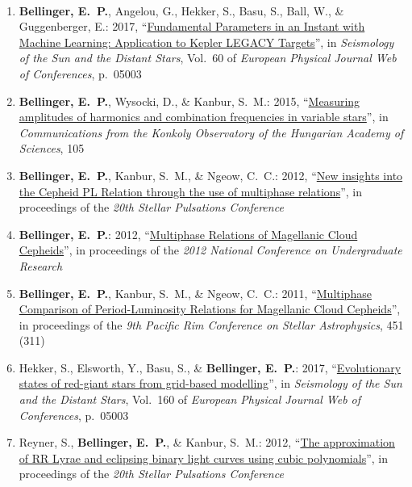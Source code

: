 \newpage
{}\\
\begin{enumerate}
    \item \textbf{Bellinger, E.~P.}, Angelou, G., Hekker, S., Basu, S., Ball, W., \& Guggenberger, E.: 2017,
    ``\href{http://adsabs.harvard.edu/abs/2017EPJWC.16005003B}{Fundamental Parameters in an Instant with Machine Learning: Application to Kepler LEGACY Targets}'', 
    in \emph{Seismology of the Sun and the Distant Stars}, 
    Vol.~60 of \emph{European Physical Journal Web of Conferences}, p.~05003 
    
    \item \textbf{Bellinger, E.~P.}, Wysocki, D., \& Kanbur, S.~M.: 2015,
    ``\href{http://adsabs.harvard.edu/abs/2016CoKon.105..101B}{Measuring amplitudes of harmonics and combination frequencies in variable stars}'', 
    in \emph{Communications from the Konkoly Observatory of the Hungarian Academy of Sciences}, 105 
    
    \item \textbf{Bellinger, E.~P.}, Kanbur, S.~M., \& Ngeow, C.~C.: 2012, 
    ``\href{https://static-content.springer.com/esm/chp\%3A10.1007\%2F978-3-642-29630-7_53/MediaObjects/299986_1_En_53_MOESM13_ESM.pdf}{New insights into the Cepheid PL Relation through the use of multiphase relations}'', 
    in proceedings of the \emph{20th Stellar Pulsations Conference} 
    
    \item \textbf{Bellinger, E.~P.}: 2012,
    ``\href{http://www.ncurproceedings.org/ojs/index.php/NCUR2012/article/view/300}{Multiphase Relations of Magellanic Cloud Cepheids}'', 
    in proceedings of the \emph{2012 National Conference on Undergraduate Research}
    
    \item \textbf{Bellinger, E.~P.}, Kanbur, S.~M., \& Ngeow, C.~C.: 2011,
    ``\href{http://aspbooks.org/custom/publications/paper/451-0311.html}{Multiphase Comparison of Period-Luminosity Relations for Magellanic Cloud Cepheids}'', 
    in proceedings of the \emph{9th Pacific Rim Conference on Stellar Astrophysics}, 451 (311)
    
    \item Hekker, S., Elsworth, Y., Basu, S., \& \textbf{Bellinger, E.~P.}: 2017,
    ``\href{http://adsabs.harvard.edu/abs/2017EPJWC.16004006H}{Evolutionary states of red-giant stars from grid-based modelling}'', 
    in \emph{Seismology of the Sun and the Distant Stars}, 
    Vol.~160 of \emph{European Physical Journal Web of Conferences}, p.~05003 
    
    \item Reyner, S., \textbf{Bellinger, E.~P.}, \& Kanbur, S.~M.: 2012,
    ``\href{https://static-content.springer.com/esm/chp\%3A10.1007\%2F978-3-642-29630-7_53/MediaObjects/299986_1_En_53_MOESM44_ESM.pdf}{The approximation of RR Lyrae and eclipsing binary light curves using cubic polynomials}'', 
    in proceedings of the \emph{20th Stellar Pulsations Conference}
\end{enumerate}
    
